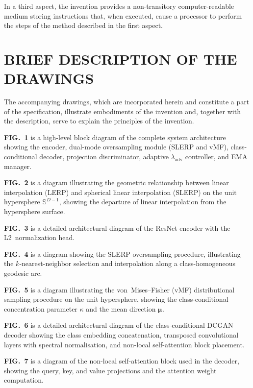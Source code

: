 \documentclass[12pt,letterpaper]{article}
\newcommand{\bmu}{\bm{\mu}}
\newcommand{\Sphere}{\mathbb{S}}
\begin{document}
In a third aspect, the invention provides a non-transitory computer-readable
medium storing instructions that, when executed, cause a processor to perform
the steps of the method described in the first aspect.

\section*{BRIEF DESCRIPTION OF THE DRAWINGS}

The accompanying drawings, which are incorporated herein and constitute a
part of the specification, illustrate embodiments of the invention and,
together with the description, serve to explain the principles of the
invention.

\textbf{FIG.~1} is a high-level block diagram of the complete system
architecture showing the encoder, dual-mode oversampling module (SLERP and
vMF), class-conditional decoder, projection discriminator, adaptive
$\lambda_{\text{adv}}$ controller, and EMA manager.

\textbf{FIG.~2} is a diagram illustrating the geometric relationship between
linear interpolation (LERP) and spherical linear interpolation (SLERP) on the
unit hypersphere $\Sphere^{D-1}$, showing the departure of linear
interpolation from the hypersphere surface.

\textbf{FIG.~3} is a detailed architectural diagram of the ResNet encoder
with the L2~normalization head.

\textbf{FIG.~4} is a diagram showing the SLERP oversampling procedure,
illustrating the $k$-nearest-neighbor selection and interpolation along a
class-homogeneous geodesic arc.

\textbf{FIG.~5} is a diagram illustrating the von~Mises--Fisher (vMF)
distributional sampling procedure on the unit hypersphere, showing the
class-conditional concentration parameter $\kappa$ and the mean direction
$\bmu$.

\textbf{FIG.~6} is a detailed architectural diagram of the class-conditional
DCGAN decoder showing the class embedding concatenation, transposed
convolutional layers with spectral normalisation, and non-local
self-attention block placement.

\textbf{FIG.~7} is a diagram of the non-local self-attention block used in
the decoder, showing the query, key, and value projections and the attention
weight computation.
\end{document}
